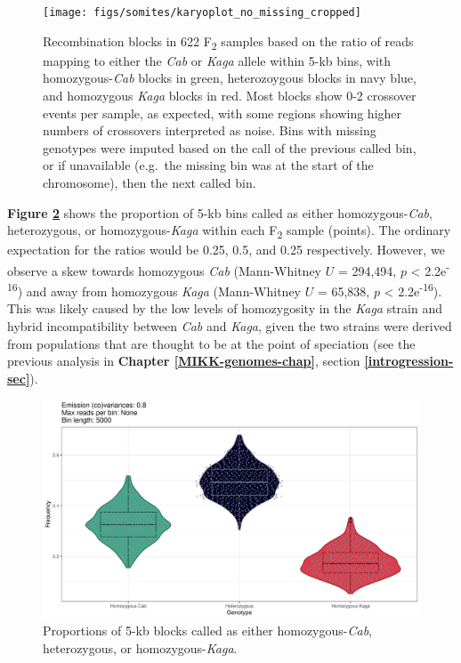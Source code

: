 \documentclass[
]{book}
\begin{document}
\begin{figure}
\texttt{[image: figs/somites/karyoplot\_no\_missing\_cropped]} \caption{Recombination blocks in 622 F\textsubscript{2} samples based on the ratio of reads mapping to either the \emph{Cab} or \emph{Kaga} allele within 5-kb bins, with homozygous-\emph{Cab} blocks in green, heterozoygous blocks in navy blue, and homozygous \emph{Kaga} blocks in red. Most blocks show 0-2 crossover events per sample, as expected, with some regions showing higher numbers of crossovers interpreted as noise. Bins with missing genotypes were imputed based on the call of the previous called bin, or if unavailable (e.g.~the missing bin was at the start of the chromosome), then the next called bin.}\label{fig:karyo-no-missing}
\end{figure}

\textbf{Figure \ref{fig:prop-sites-total}} shows the proportion of 5-kb bins called as either homozygous-\emph{Cab}, heterozygous, or homozygous-\emph{Kaga} within each F\textsubscript{2} sample (points). The ordinary expectation for the ratios would be 0.25, 0.5, and 0.25 respectively. However, we observe a skew towards homozygous \emph{Cab} (Mann-Whitney \(U\) = 294,494, \(p\) \textless{} 2.2e\textsuperscript{-16}) and away from homozygous \emph{Kaga} (Mann-Whitney \(U\) = 65,838, \(p\) \textless{} 2.2e\textsuperscript{-16}). This was likely caused by the low levels of homozygosity in the \emph{Kaga} strain and hybrid incompatibility between \emph{Cab} and \emph{Kaga}, given the two strains were derived from populations that are thought to be at the point of speciation (see the previous analysis in \textbf{Chapter \ref{MIKK-genomes-chap}}, section \textbf{\ref{introgression-sec}}).



\begin{figure}
\includegraphics[width=1\linewidth]{figs/somites/prop_sites_total} \caption{Proportions of 5-kb blocks called as either homozygous-\emph{Cab}, heterozygous, or homozygous-\emph{Kaga}.}\label{fig:prop-sites-total}
\end{figure}
\end{document}
